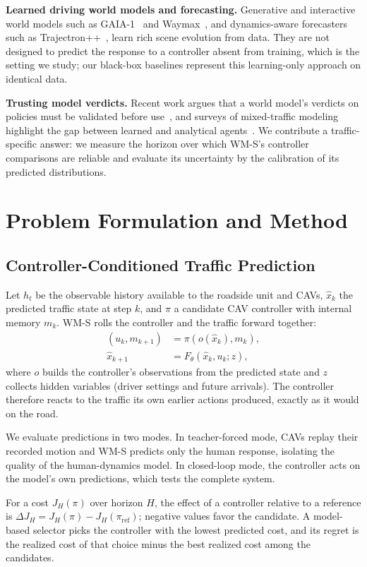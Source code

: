 \documentclass[conference]{IEEEtran}
\begin{document}
\textbf{Learned driving world models and forecasting.} Generative and interactive world models such as GAIA-1~\cite{hu_gaia1} and Waymax~\cite{gulino_waymax}, and dynamics-aware forecasters such as Trajectron++~\cite{salzmann_trajectronpp}, learn rich scene evolution from data. They are not designed to predict the response to a controller absent from training, which is the setting we study; our black-box baselines represent this learning-only approach on identical data.

\textbf{Trusting model verdicts.} Recent work argues that a world model's verdicts on policies must be validated before use~\cite{oefinger_admissibility}, and surveys of mixed-traffic modeling highlight the gap between learned and analytical agents~\cite{rahmani_survey}. We contribute a traffic-specific answer: we measure the horizon over which WM-S's controller comparisons are reliable and evaluate its uncertainty by the calibration of its predicted distributions.

\section{Problem Formulation and Method}
\subsection{Controller-Conditioned Traffic Prediction}
Let $h_t$ be the observable history available to the roadside unit and CAVs, $\hat{x}_k$ the predicted traffic state at step $k$, and $\pi$ a candidate CAV controller with internal memory $m_k$. WM-S rolls the controller and the traffic forward together:
\begin{align}
 (u_k,m_{k+1}) &= \pi(o(\hat{x}_k),m_k),\\
 \hat{x}_{k+1} &= F_\theta(\hat{x}_k,u_k;z),
\end{align}
where $o$ builds the controller's observations from the predicted state and $z$ collects hidden variables (driver settings and future arrivals). The controller therefore reacts to the traffic its own earlier actions produced, exactly as it would on the road.

We evaluate predictions in two modes. In teacher-forced mode, CAVs replay their recorded motion and WM-S predicts only the human response, isolating the quality of the human-dynamics model. In closed-loop mode, the controller acts on the model's own predictions, which tests the complete system.

For a cost $J_H(\pi)$ over horizon $H$, the effect of a controller relative to a reference is $\Delta J_H=J_H(\pi)-J_H(\pi_{\mathrm{ref}})$; negative values favor the candidate. A model-based selector picks the controller with the lowest predicted cost, and its regret is the realized cost of that choice minus the best realized cost among the candidates.
\end{document}
